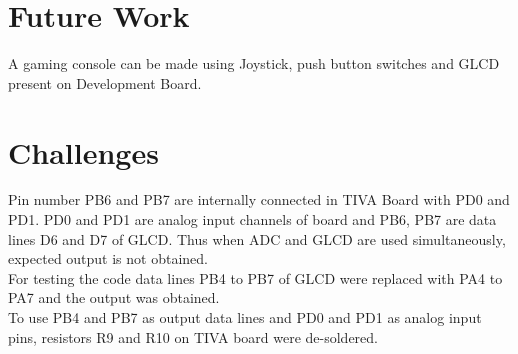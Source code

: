 \documentclass[a4paper,12pt,oneside]{book}
\begin{document}
\section{Future Work}
A gaming console can be made using Joystick, push button switches and GLCD present on Development Board.


\section{Challenges}
Pin number PB6 and PB7 are internally connected in TIVA Board with PD0 and PD1. PD0 and PD1 are analog input channels of board and PB6, PB7 are data lines D6 and D7 of GLCD. Thus when ADC and GLCD are used simultaneously, expected output is not obtained. \\
For testing the code data lines PB4 to PB7 of GLCD were replaced with PA4 to PA7 and the output was obtained.\\
To use PB4 and PB7 as output data lines and PD0 and PD1 as analog input pins, resistors R9 and R10 on TIVA board were de-soldered.
\end{document}
